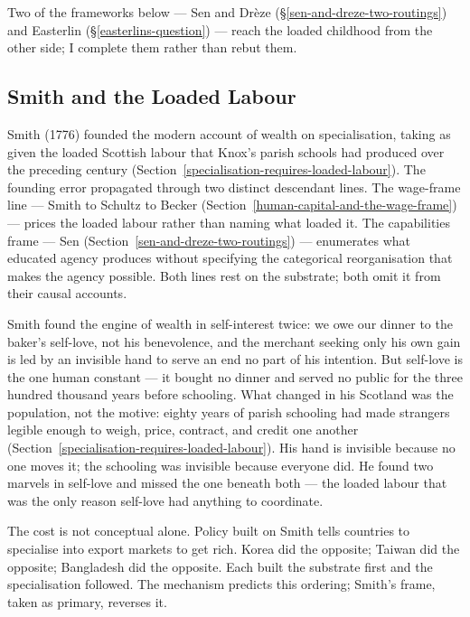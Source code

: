 \documentclass[12pt,letterpaper]{article}
\begin{document}
Two of the frameworks below --- Sen and Drèze (§\ref{sen-and-dreze-two-routings}) and Easterlin (§\ref{easterlins-question}) --- reach the loaded childhood from the other side; I complete them rather than rebut them.

\subsection{Smith and the Loaded Labour}\label{smith-and-the-loaded-labour}

Smith (1776) founded the modern account of wealth on specialisation, taking as given the loaded Scottish labour that Knox's parish schools had produced over the preceding century (Section~\ref{specialisation-requires-loaded-labour}). The founding error propagated through two distinct descendant lines. The wage-frame line --- Smith to Schultz to Becker (Section~\ref{human-capital-and-the-wage-frame}) --- prices the loaded labour rather than naming what loaded it. The capabilities frame --- Sen (Section~\ref{sen-and-dreze-two-routings}) --- enumerates what educated agency produces without specifying the categorical reorganisation that makes the agency possible. Both lines rest on the substrate; both omit it from their causal accounts.

Smith found the engine of wealth in self-interest twice: we owe our dinner to the baker's self-love, not his benevolence, and the merchant seeking only his own gain is led by an invisible hand to serve an end no part of his intention. But self-love is the one human constant --- it bought no dinner and served no public for the three hundred thousand years before schooling. What changed in his Scotland was the population, not the motive: eighty years of parish schooling had made strangers legible enough to weigh, price, contract, and credit one another (Section~\ref{specialisation-requires-loaded-labour}). His hand is invisible because no one moves it; the schooling was invisible because everyone did. He found two marvels in self-love and missed the one beneath both --- the loaded labour that was the only reason self-love had anything to coordinate.

The cost is not conceptual alone. Policy built on Smith tells countries to specialise into export markets to get rich. Korea did the opposite; Taiwan did the opposite; Bangladesh did the opposite. Each built the substrate first and the specialisation followed. The mechanism predicts this ordering; Smith's frame, taken as primary, reverses it.
\end{document}
